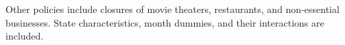 \documentclass{beamer}
\begin{document}
\begin{frame}
\begin{table}
\begin{minipage}{\linewidth}
  \end{minipage}
\end{table}
\begin{flushleft}
\tiny
Other policies include closures of movie theaters, restaurants, and non-essential businesses.  State characteristics, month dummies, and their interactions are included.

\end{flushleft}
\end{frame}
\end{document}
